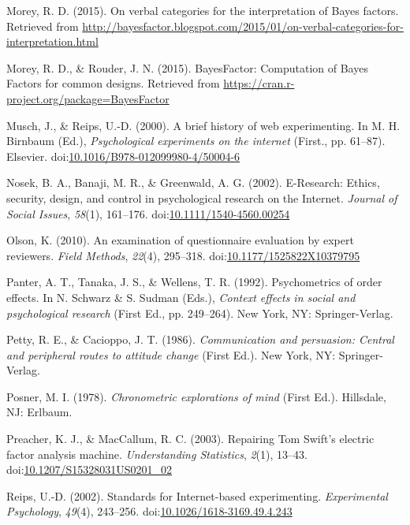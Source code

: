 \documentclass[english,man]{apa6}
\theoremstyle{definition}
\theoremstyle{definition}
\theoremstyle{definition}
\theoremstyle{remark}
\begin{document}
\hypertarget{ref-Morey2015c}{}
Morey, R. D. (2015). On verbal categories for the interpretation of
Bayes factors. Retrieved from
\url{http://bayesfactor.blogspot.com/2015/01/on-verbal-categories-for-interpretation.html}

\hypertarget{ref-Morey2015b}{}
Morey, R. D., \& Rouder, J. N. (2015). BayesFactor: Computation of Bayes
Factors for common designs. Retrieved from
\url{https://cran.r-project.org/package=BayesFactor}

\hypertarget{ref-Musch2000}{}
Musch, J., \& Reips, U.-D. (2000). A brief history of web experimenting.
In M. H. Birnbaum (Ed.), \emph{Psychological experiments on the
internet} (First., pp. 61--87). Elsevier.
doi:\href{https://doi.org/10.1016/B978-012099980-4/50004-6}{10.1016/B978-012099980-4/50004-6}

\hypertarget{ref-Nosek2002}{}
Nosek, B. A., Banaji, M. R., \& Greenwald, A. G. (2002). E-Research:
Ethics, security, design, and control in psychological research on the
Internet. \emph{Journal of Social Issues}, \emph{58}(1), 161--176.
doi:\href{https://doi.org/10.1111/1540-4560.00254}{10.1111/1540-4560.00254}

\hypertarget{ref-Olson2010}{}
Olson, K. (2010). An examination of questionnaire evaluation by expert
reviewers. \emph{Field Methods}, \emph{22}(4), 295--318.
doi:\href{https://doi.org/10.1177/1525822X10379795}{10.1177/1525822X10379795}

\hypertarget{ref-Panter1992}{}
Panter, A. T., Tanaka, J. S., \& Wellens, T. R. (1992). Psychometrics of
order effects. In N. Schwarz \& S. Sudman (Eds.), \emph{Context effects
in social and psychological research} (First Ed., pp. 249--264). New
York, NY: Springer-Verlag.

\hypertarget{ref-Petty1986}{}
Petty, R. E., \& Cacioppo, J. T. (1986). \emph{Communication and
persuasion: Central and peripheral routes to attitude change} (First
Ed.). New York, NY: Springer-Verlag.

\hypertarget{ref-Posner1978}{}
Posner, M. I. (1978). \emph{Chronometric explorations of mind} (First
Ed.). Hillsdale, NJ: Erlbaum.

\hypertarget{ref-Preacher2003}{}
Preacher, K. J., \& MacCallum, R. C. (2003). Repairing Tom Swift's
electric factor analysis machine. \emph{Understanding Statistics},
\emph{2}(1), 13--43.
doi:\href{https://doi.org/10.1207/S15328031US0201_02}{10.1207/S15328031US0201\_02}

\hypertarget{ref-Reips2002a}{}
Reips, U.-D. (2002). Standards for Internet-based experimenting.
\emph{Experimental Psychology}, \emph{49}(4), 243--256.
doi:\href{https://doi.org/10.1026/1618-3169.49.4.243}{10.1026/1618-3169.49.4.243}
\end{document}
